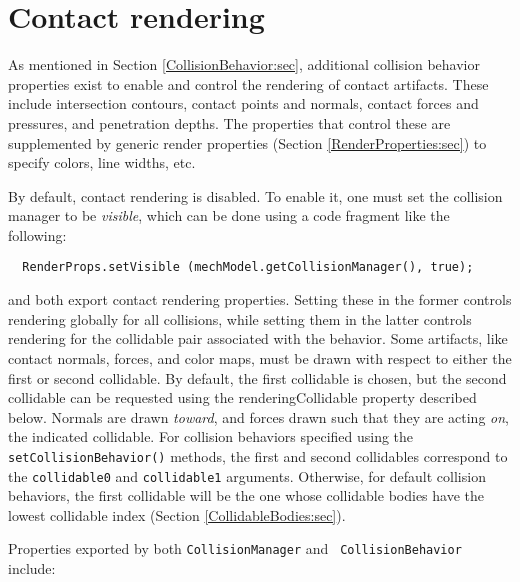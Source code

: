 \section{Contact rendering}
\label{ContactRendering:sec}

As mentioned in Section \ref{CollisionBehavior:sec}, additional
collision behavior properties exist to enable and control the
rendering of contact artifacts. These include intersection contours,
contact points and normals, contact forces and pressures, and
penetration depths. The properties that control these are supplemented
by generic render properties (Section \ref{RenderProperties:sec}) to
specify colors, line widths, etc. 

By default, contact rendering is disabled. To enable it, one must set
the collision manager to be {\it visible}, which can be done using a code
fragment like the following:
%
\begin{verbatim}
  RenderProps.setVisible (mechModel.getCollisionManager(), true);
\end{verbatim}
%

 and
both export contact rendering properties. Setting these in the former
controls rendering globally for all collisions, while setting them in
the latter controls rendering for the collidable pair associated with
the behavior.  Some artifacts, like contact normals, forces, and color
maps, must be drawn with respect to either the first or second
collidable. By default, the first collidable is chosen, but the second
collidable can be requested using the {\sf renderingCollidable}
property described below. Normals are drawn {\it toward}, and forces
drawn such that they are acting {\it on}, the indicated
collidable. For collision behaviors specified using the {\tt
setCollisionBehavior()} methods, the first and second collidables
correspond to the {\tt collidable0} and {\tt collidable1} arguments.
Otherwise, for default collision behaviors, the first collidable will
be the one whose collidable bodies have the lowest collidable index
(Section \ref{CollidableBodies:sec}).

Properties exported by both {\tt CollisionManager} and {\tt
CollisionBehavior} include:

